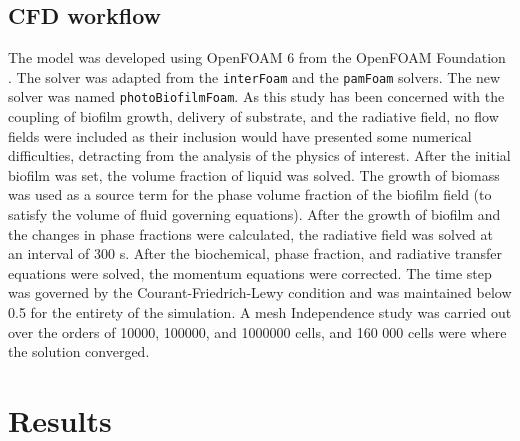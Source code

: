\subsection{CFD workflow}
The model was developed using OpenFOAM 6 from the OpenFOAM Foundation \cite{openfoamfoundationltd2017}. The solver was adapted from the \texttt{interFoam} and the \texttt{pamFoam} solvers. The new solver was named \texttt{photoBiofilmFoam}. As this study has been concerned with the coupling of biofilm growth, delivery of substrate, and the radiative field, no flow fields were included as their inclusion would have presented some numerical difficulties, detracting from the analysis of the physics of interest. After the initial biofilm was set, the volume fraction of liquid was solved. The growth of biomass was used as a source term for the phase volume fraction of the biofilm field (to satisfy the volume of fluid governing equations). After the growth of biofilm and the changes in phase fractions were calculated, the radiative field was solved at an interval of 300 s. After the biochemical, phase fraction, and radiative transfer equations were solved, the momentum equations were corrected. The time step was governed by the Courant-Friedrich-Lewy condition and was maintained below 0.5 for the entirety of the simulation. A mesh Independence study was  carried out over the orders of \num{10000}, \num{100000}, and \num{1000000} cells, and 160 000 cells were where the solution converged. 

\section{Results}

